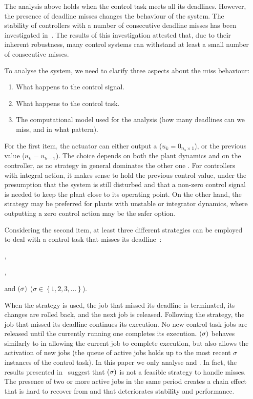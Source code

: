 The analysis above holds when the control task meets all its deadlines.
However, the presence of deadline misses changes the behaviour of the system.
The stability of controllers with a number of consecutive deadline misses has been investigated in~\cite{Maggio:2020}.
The results of this investigation attested that, due to their inherent robustness, many control systems can withstand at least a small number of consecutive misses.

To analyse the system, we need to clarify three aspects about the miss behaviour:

\begin{enumerate}[label=(\roman*)]
    \item What happens to the control signal.
    \item What happens to the control task.
    \item The computational model used for the analysis (how many deadlines can we miss, and in what pattern).
\end{enumerate}

For the first item, the actuator can either output a \tZ{} ($u_k = 0_{n_u \times 1}$), or \tH{} the previous value ($u_k = u_{k-1}$).
The choice depends on both the plant dynamics and on the controller, as no strategy in general dominates the other one \cite{schenato09}.
For controllers with integral action, it makes sense to hold the previous control value, under the presumption that the system is still disturbed and that a non-zero control signal is needed to keep the plant close to its operating point.
On the other hand, the \tZ{} strategy may be preferred for plants with unstable or integrator dynamics, where outputting a zero control action may be the safer option.

Considering the second item, at least three different strategies can be employed to deal with a control task that misses its deadline~\cite{Cervin:2005}:
\begin{enumerate*}[label=(\roman*)]
    \item \tK{},
    \item \tS{},
    \item and \tQ{}$\left( \sigma \right)$ ($\sigma \in \left\{ 1, 2, 3, \ldots \right\}$).
\end{enumerate*}
%
When the \tK{} strategy is used, the job that missed its deadline is terminated, its changes are rolled back, and the next job is released.
Following the \tS{} strategy, the job that missed its deadline continues its execution.
No new control task jobs are released until the currently running one completes its execution.
\tQ{}$\left( \sigma \right)$ behaves similarly to \tS{} in allowing the current job to complete execution, but also allows the activation of new jobs (the queue of active jobs holds up to the most recent $\sigma$ instances of the control task).
In this paper we only analyse \tK{} and \tS{}.
In fact, the results presented in~\cite{Cervin:2005,Maggio:2020} suggest that \tQ{}$\left( \sigma \right)$ is not a feasible strategy to handle misses.
The presence of two or more active jobs in the same period creates a chain effect that is hard to recover from and that deteriorates stability and performance.

